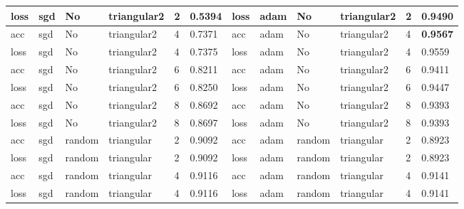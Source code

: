 \begin{table}[H]
\begin{adjustbox}{width=1\textwidth}
\begin{tabular}{|l|l|l|l|l|l||l|l|l|l|l|l|}
loss          & sgd          & No          & triangular2     & 2             & 0.5394            & loss          & adam         & No          & triangular2     & 2             & 0.9490            \\ \hline
acc           & sgd          & No          & triangular2     & 4             & 0.7371            & acc           & adam         & No          & triangular2     & 4             & \textbf{0.9567}   \\ \hline
loss          & sgd          & No          & triangular2     & 4             & 0.7375            & loss          & adam         & No          & triangular2     & 4             & 0.9559            \\ \hline
acc           & sgd          & No          & triangular2     & 6             & 0.8211            & acc           & adam         & No          & triangular2     & 6             & 0.9411            \\ \hline
loss          & sgd          & No          & triangular2     & 6             & 0.8250            & loss          & adam         & No          & triangular2     & 6             & 0.9447            \\ \hline
acc           & sgd          & No          & triangular2     & 8             & 0.8692            & acc           & adam         & No          & triangular2     & 8             & 0.9393            \\ \hline
loss          & sgd          & No          & triangular2     & 8             & 0.8697            & loss          & adam         & No          & triangular2     & 8             & 0.9393            \\ \hline
acc           & sgd          & random        & triangular      & 2             & 0.9092            & acc           & adam         & random        & triangular      & 2             & 0.8923            \\ \hline
loss          & sgd          & random        & triangular      & 2             & 0.9092            & loss          & adam         & random        & triangular      & 2             & 0.8923            \\ \hline
acc           & sgd          & random        & triangular      & 4             & 0.9116            & acc           & adam         & random        & triangular      & 4             & 0.9141            \\ \hline
loss          & sgd          & random        & triangular      & 4             & 0.9116            & loss          & adam         & random        & triangular      & 4             & 0.9141            \\ \hline

\end{tabular}
\end{adjustbox}
\end{table}
